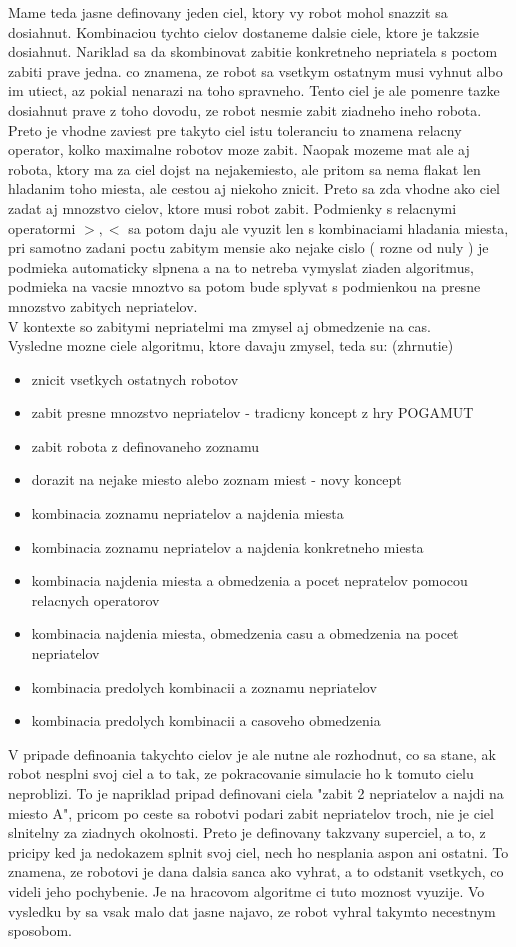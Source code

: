 \documentclass[a4paper,11pt,final]{report}
\begin{document}
Mame teda jasne definovany jeden ciel, ktory vy robot mohol snazzit sa dosiahnut. Kombinaciou tychto cielov dostaneme dalsie ciele, ktore je takzsie dosiahnut. Nariklad sa da skombinovat zabitie konkretneho nepriatela s poctom zabiti prave jedna. co znamena, ze robot sa vsetkym ostatnym musi vyhnut albo im utiect, az pokial nenarazi na toho spravneho. Tento ciel je ale pomenre tazke dosiahnut prave z toho dovodu, ze robot nesmie zabit ziadneho ineho robota. Preto je vhodne zaviest pre takyto ciel istu toleranciu to znamena relacny operator, kolko maximalne robotov moze zabit. Naopak mozeme mat ale aj robota, ktory ma za ciel dojst na nejakemiesto, ale pritom sa nema flakat len hladanim toho miesta, ale cestou aj niekoho znicit. Preto sa zda vhodne ako ciel zadat aj mnozstvo cielov, ktore musi robot zabit. Podmienky s relacnymi operatormi  $>, <$ sa potom daju ale vyuzit len s kombinaciami hladania miesta, pri samotno zadani poctu zabitym mensie ako nejake cislo ( rozne od nuly ) je podmieka automaticky slpnena a na to netreba vymyslat ziaden algoritmus, podmieka na vacsie mnoztvo sa potom bude splyvat s podmienkou na presne mnozstvo zabitych nepriatelov.\\
V kontexte so zabitymi nepriatelmi ma zmysel aj obmedzenie na cas.\\%
Vysledne mozne ciele algoritmu, ktore davaju zmysel, teda su: (zhrnutie)
\begin{itemize}
\item znicit vsetkych ostatnych robotov
\item zabit presne mnozstvo nepriatelov - tradicny koncept z hry POGAMUT
\item zabit robota z definovaneho zoznamu
\item dorazit na nejake miesto alebo zoznam miest - novy koncept
\item kombinacia zoznamu nepriatelov a najdenia miesta
\item kombinacia zoznamu nepriatelov a najdenia konkretneho miesta
\item kombinacia najdenia miesta a obmedzenia a pocet nepratelov pomocou relacnych operatorov
\item kombinacia najdenia miesta, obmedzenia casu a obmedzenia na pocet nepriatelov
\item kombinacia predolych kombinacii a zoznamu nepriatelov
\item kombinacia predolych kombinacii a casoveho obmedzenia %
\end{itemize}
V pripade definoania takychto cielov je ale nutne ale rozhodnut, co sa stane, ak robot nesplni svoj ciel a to tak, ze pokracovanie simulacie ho k tomuto cielu neproblizi. To je napriklad pripad definovani ciela "zabit 2 nepriatelov a najdi na miesto A", pricom po ceste sa robotvi podari zabit nepriatelov troch, nie je ciel slnitelny za ziadnych okolnosti. Preto je definovany takzvany superciel, a to, z pricipy ked ja nedokazem splnit svoj ciel, nech ho nesplania aspon ani ostatni. To znamena, ze robotovi je dana dalsia sanca ako vyhrat, a to odstanit vsetkych, co videli jeho pochybenie. Je na hracovom algoritme ci tuto moznost vyuzije. Vo vysledku by sa vsak malo dat jasne najavo, ze robot vyhral takymto necestnym sposobom.\\
\end{document}
